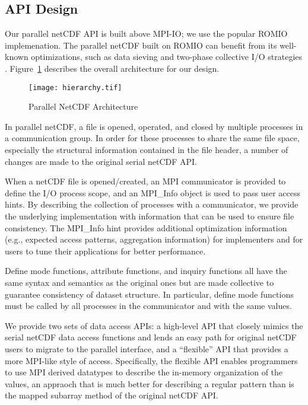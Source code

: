 \documentclass[10pt,twocolumn]{article}          %
\begin{document}
\subsection{API Design}

Our parallel netCDF API is built above MPI-IO; we use the popular ROMIO implemenation.  The parallel netCDF built on ROMIO can benefit from its well-known optimizations,
such as data sieving and two-phase collective I/O strategies \cite{RoBC93, TBCP94, ThCh96,ThGL99}.
Figure~\ref{figure:hierarchy} describes the overall architecture for our design.

\begin{figure}
\begin{center}
\texttt{[image: hierarchy.tif]}
\end{center}
\vskip -0.1in \caption{Parallel NetCDF Architecture}
\label{figure:hierarchy}
\end{figure}

In parallel netCDF, a file is opened, operated, and closed by
multiple processes in a communication group. In order for these
processes to share the same file space, especially the structural
information contained in the file header, a number of changes are
made to the original serial netCDF API.

When a netCDF file is opened/created, an MPI communicator is provided to define the I/O process
scope, and an MPI\_Info object is used to pass user access hints. By describing the collection of
processes with a communicator, we provide the underlying implementation with information that
can be used to ensure file consistency. The MPI\_Info hint provides additional
optimization information (e.g., expected access patterns, aggregation information) for implementers
and for users to tune their applications for better performance.

Define mode functions, attribute functions, and inquiry
functions all have the same syntax and semantics as the original ones
but are made collective to guarantee consistency of dataset
structure. In particular, define mode functions must be called by
all processes in the communicator and with the same values.

We provide two sets of data access APIs: a high-level API that closely mimics the serial netCDF
data access functions and lends an easy path for original netCDF users to migrate to the parallel
interface, and a ``flexible'' API that provides a more MPI-like style of access. Specifically, the
flexible API enables programmers to use MPI derived datatypes to describe the
in-memory organization of the values, an appraoch that is much better for describing a regular pattern than
is the mapped subarray method of the original netCDF API.
\end{document}
